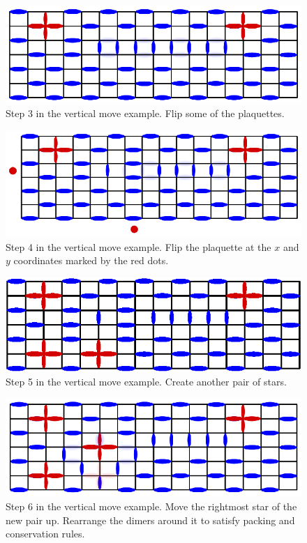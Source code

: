 \documentclass[aps,floatfix,11pt]{revtex4-1}
\begin{document}
\begin{figure}[h]
    \centering
    \includegraphics[width=8.5 cm]{ex_vert_mv_3}
    \caption{Step 3 in the vertical move example. Flip some of the plaquettes.\label{fig:ex_vert_mv_3}}
\end{figure}


\begin{figure}[h]
    \centering
    \includegraphics[width=8.5 cm]{ex_vert_mv_4}
    \caption{Step 4 in the vertical move example. Flip the plaquette at the $x$ and $y$ coordinates
    marked by the red dots.\label{fig:ex_vert_mv_4}}
\end{figure}


\begin{figure}[h]
    \centering
    \includegraphics[width=8.5 cm]{ex_vert_mv_5}
    \caption{Step 5 in the vertical move example. Create another pair of stars.\label{fig:ex_vert_mv_5}}
\end{figure}

\begin{figure}[h]
    \centering
    \includegraphics[width=8.5 cm]{ex_vert_mv_6}
    \caption{Step 6 in the vertical move example. Move the rightmost star of the new pair up.
    Rearrange the dimers around it to satisfy packing and conservation rules.\label{fig:ex_vert_mv_6}}
\end{figure}


% 
\end{document}
